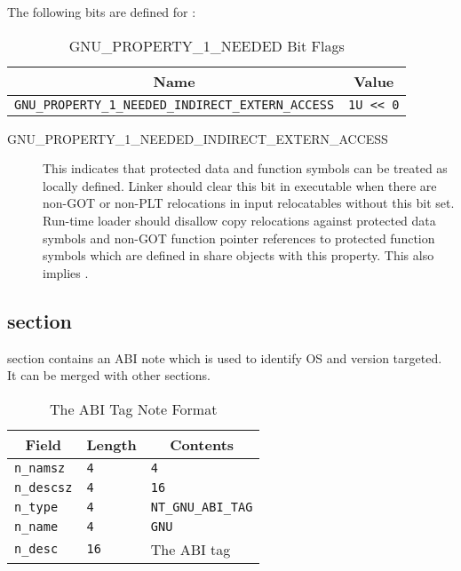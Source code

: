 The following bits are defined for :

\begin{table}[H]
\Hrule
  \caption{GNU_PROPERTY_1_NEEDED Bit Flags}
  \begin{center}
    \begin{tabular}[t]{l|l}
      \multicolumn{1}{c}{Name} & \multicolumn{1}{c}{Value} \\
      \hline
     \texttt{GNU_PROPERTY_1_NEEDED_INDIRECT_EXTERN_ACCESS} & \texttt{1U << 0} \\
    \end{tabular}
  \end{center}
\Hrule
\end{table}

\begin{description}
 \item[GNU_PROPERTY_1_NEEDED_INDIRECT_EXTERN_ACCESS]
   \begin{sloppypar}
   This indicates that protected data and function symbols can be treated
   as locally defined.  Linker should clear this bit in executable when
   there are non-GOT or non-PLT relocations in input relocatables without
   this bit set.  Run-time loader should disallow copy relocations against
   protected data symbols and non-GOT function pointer references to
   protected function symbols which are defined in share objects with this
   property.  This also implies .
   \end{sloppypar}
\end{description}

\subsection{ section}
\label{sec_abi_tag}

 section contains an ABI note which is used to
identify OS and version targeted.  It can be merged with other
 sections.

\begin{table}[H]
\Hrule
 \caption{The ABI Tag Note Format}
 \label{format-abi_tag}
 \begin{center}
  \begin{tabular}[t]{l|l|l}
   \multicolumn{1}{c}{Field}
     & \multicolumn{1}{c}{Length}
       & \multicolumn{1}{c}{Contents} \\
   \hline
   \texttt{n_namsz} & \texttt{4} & \texttt{4} \\
   \texttt{n_descsz} & \texttt{4} & \texttt{16} \\
   \texttt{n_type} & \texttt{4} & \texttt{NT_GNU_ABI_TAG} \\
   \texttt{n_name} & \texttt{4} & \texttt{GNU} \\
   \texttt{n_desc} & \texttt{16} & The ABI tag\\
  \end{tabular}
 \end{center}
\Hrule
\end{table}

